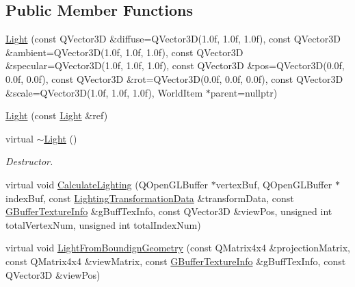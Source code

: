 \subsection*{Public Member Functions}
\begin{DoxyCompactItemize}
\item 
\mbox{\hyperlink{class_geometry_engine_1_1_geometry_world_item_1_1_geometry_light_1_1_light_a9dcea4ccc13220212d25379a52dd82b2}{Light}} (const Q\+Vector3D \&diffuse=Q\+Vector3D(1.\+0f, 1.\+0f, 1.\+0f), const Q\+Vector3\+D \&ambient=\+Q\+Vector3\+D(1.\+0f, 1.\+0f, 1.\+0f), const Q\+Vector3\+D \&specular=\+Q\+Vector3\+D(1.\+0f, 1.\+0f, 1.\+0f), const Q\+Vector3\+D \&pos=\+Q\+Vector3\+D(0.\+0f, 0.\+0f, 0.\+0f), const Q\+Vector3\+D \&rot=\+Q\+Vector3\+D(0.\+0f, 0.\+0f, 0.\+0f), const Q\+Vector3\+D \&scale=\+Q\+Vector3\+D(1.\+0f, 1.\+0f, 1.\+0f), World\+Item $\ast$parent=nullptr)
\item 
\mbox{\hyperlink{class_geometry_engine_1_1_geometry_world_item_1_1_geometry_light_1_1_light_a057f30d881c04f30fefa313c98902e34}{Light}} (const \mbox{\hyperlink{class_geometry_engine_1_1_geometry_world_item_1_1_geometry_light_1_1_light}{Light}} \&ref)
\item 
\mbox{\label{class_geometry_engine_1_1_geometry_world_item_1_1_geometry_light_1_1_light_af87a5bfe23c9ccf5c84d42e5ac4af0f7}} 
virtual \mbox{\hyperlink{class_geometry_engine_1_1_geometry_world_item_1_1_geometry_light_1_1_light_af87a5bfe23c9ccf5c84d42e5ac4af0f7}{$\sim$\+Light}} ()
\begin{DoxyCompactList}\small\item\em Destructor. \end{DoxyCompactList}\item 
virtual void \mbox{\hyperlink{class_geometry_engine_1_1_geometry_world_item_1_1_geometry_light_1_1_light_a4a133e49941a68ac8c33f757e687c8b7}{Calculate\+Lighting}} (Q\+Open\+G\+L\+Buffer $\ast$vertex\+Buf, Q\+Open\+G\+L\+Buffer $\ast$index\+Buf, const \mbox{\hyperlink{class_geometry_engine_1_1_lighting_transformation_data}{Lighting\+Transformation\+Data}} \&transform\+Data, const \mbox{\hyperlink{class_geometry_engine_1_1_g_buffer_texture_info}{G\+Buffer\+Texture\+Info}} \&g\+Buff\+Tex\+Info, const Q\+Vector3D \&view\+Pos, unsigned int total\+Vertex\+Num, unsigned int total\+Index\+Num)
\item 
virtual void \mbox{\hyperlink{class_geometry_engine_1_1_geometry_world_item_1_1_geometry_light_1_1_light_a4dfee4fc27c75493f992a84c2ea3ff95}{Light\+From\+Boundign\+Geometry}} (const Q\+Matrix4x4 \&projection\+Matrix, const Q\+Matrix4x4 \&view\+Matrix, const \mbox{\hyperlink{class_geometry_engine_1_1_g_buffer_texture_info}{G\+Buffer\+Texture\+Info}} \&g\+Buff\+Tex\+Info, const Q\+Vector3D \&view\+Pos)

\end{DoxyCompactItemize}
